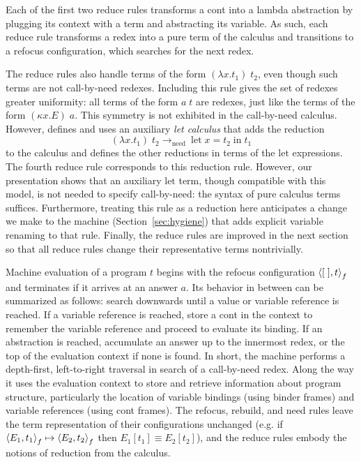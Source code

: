 \documentclass{LMCS}
\theoremstyle{plain}
\theoremstyle{remark}
\newcommand{\refocus}[1]{\Braket{#1}_f}
\newcommand{\notion}[0]{\ensuremath{\rightarrow_{\mathrm{need}}}}
\begin{document}
Each of the first two reduce rules transforms a cont into a lambda abstraction
by plugging its context with a term and abstracting its variable.  As such,
each reduce rule transforms a redex into a pure term of the calculus and
transitions to a refocus configuration, which searches for the next redex.

The reduce rules also handle terms of the form $(\lambda x.t_1)\;t_2$, even
though such terms are not call-by-need redexes.  Including this rule gives the
set of redexes greater uniformity: all terms of the form $a\;t$ are redexes,
just like the terms of the form $(\kappa x.E)\; a$.  This symmetry is not
exhibited in the call-by-need calculus.  However, \citet{ariola97need} defines
and uses an auxiliary \emph{let calculus} that adds the reduction
\begin{displaymath}
      (\lambda x.t_1)\;t_2 \notion\ \mathrm{let}\; x=t_2\; \mathrm{in}\; t_1
\end{displaymath}
to the calculus and defines the other reductions in terms of the $\mathrm{let}$
expressions.  The fourth reduce rule corresponds to this reduction rule.
However, our presentation shows that an auxiliary $\mathrm{let}$ term, though
compatible with this model, is not needed to specify call-by-need: the syntax
of pure calculus terms suffices.  Furthermore, treating this rule as a
reduction here anticipates a change we make to the machine
(Section~\ref{sec:hygiene}) that adds explicit variable renaming to that rule.
Finally, the reduce rules are improved in the next section so that all reduce
rules change their representative terms nontrivially.

Machine evaluation of a program $t$ begins with the refocus configuration
$\refocus{[\;],t}$ and terminates if it arrives at an answer $a$.
Its behavior in between can be summarized as follows: search downwards until a
value or variable reference is reached.  If a variable reference is reached,
store a cont in the context to remember the variable reference and proceed to
evaluate its binding.  If an abstraction is reached, accumulate an answer up to
the innermost redex, or the top of the evaluation context if none is found.  In
short, the machine performs a depth-first, left-to-right traversal in search of
a call-by-need redex.  Along the way it uses the evaluation context to store
and retrieve information about program structure, particularly the location of
variable bindings (using binder frames) and variable references (using cont
frames). The refocus, rebuild, and need rules leave the term representation of
their configurations unchanged (e.g. if $\refocus{E_1,t_1} \mapsto
\refocus{E_2,t_2}$ then $E_1[t_1] \equiv E_2[t_2]$), and the reduce rules
embody the notions of reduction from the calculus.
\end{document}
